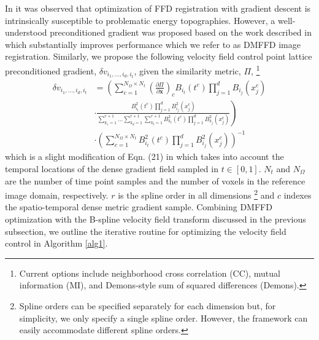 \documentclass{llncs}
\begin{document}
In \cite{tustison2009} 
it was observed that optimization of FFD registration with gradient descent is 
intrinsically susceptible to problematic energy topographies.  However, a
well-understood preconditioned gradient was proposed based on the work 
described in \cite{tustison2006} which substantially 
improves performance which we refer to as DMFFD image registration.  
Similarly, we propose the following velocity field control
point lattice preconditioned gradient,
$\delta v_{i_1,\ldots,i_d,i_t}$, given the similarity metric, $\Pi$,%
\footnote
{
Current options include neighborhood cross correlation (CC), mutual information (MI), and
Demons-style sum of squared differences (Demons).
}
\begin{align}
\label{eq:dmffd}
  \delta v_{i_1,\ldots,i_d,i_t} &= \left( \sum_{c=1}^{N_{\Omega} \times N_t} \left( \frac{\partial \Pi}{\partial \mathbf{x}} \right)_c B_{i_t}(t^c)\prod_{j=1}^d B_{i_j}(x_j^c)  \right. \nonumber \\
  &\cdot \left. \frac{B_{i_t}^2(t^c) \prod_{j=1}^d B_{i_j}^2 (x_j^c)} 
  {\sum_{k_1=1}^{r+1}\ldots\sum_{k_d=1}^{r+1} \sum_{k_t=1}^{r+1} B_{k_t}^2(t^c) 
  \prod_{j=1}^d B_{k_j}^2 (x_j^c)} \right) \nonumber \\
  &\cdot\left({\sum_{c=1}^{N_{\Omega}\times N_t}B_{i_t}^2(t^c) \prod_{j=1}^d B_{i_j}^2 (x_j^c)} \right) ^{-1}
\end{align}
which is a slight modification of Eqn. (21)
in \cite{tustison2009} which takes into account the temporal locations of the 
dense gradient field sampled in $t \in [0,1]$. $N_t$ and $N_\Omega$ are the number
of time point samples and the number of voxels in the reference image domain, respectively.
$r$ is the spline order in all dimensions%
\footnote{
Spline orders can be specified separately for each dimension but, for simplicity,
we only specify a single spline order.  However, the framework can easily 
accommodate different spline orders.
}
and $c$ indexes the spatio-temporal dense metric
gradient sample.
Combining DMFFD optimization with the B-spline velocity field transform discussed in
the previous subsection, we outline the iterative routine for optimizing the 
velocity field control in Algorithm \ref{alg1}.
\end{document}
